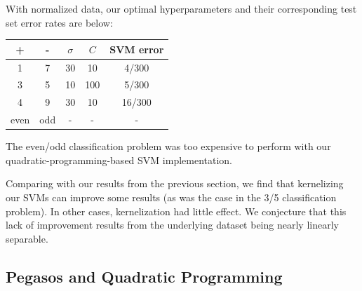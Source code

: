 \documentclass{article}
\begin{document}
\begin{multicols}{2}
With normalized data, our optimal hyperparameters
and their corresponding test set error rates are below:
\begin{center}
\begin{tabular}{|c|c|c|c|c|}
\hline
+ & - & $\sigma$ & $C$ & SVM error \\\hline
1 & 7 &30 & 10 & 4/300 \\
3 & 5 &10 & 100 & 5/300\\
4 & 9 & 30 & 10 & 16/300\\
even & odd & - & - & - \\\hline
\end{tabular}
\end{center}
The even/odd classification problem was
too expensive to perform
with our quadratic-programming-based SVM implementation.

Comparing with our results from the previous section,
we find that kernelizing our SVMs can improve some results
(as was the case in the 3/5 classification problem).
In other cases, kernelization had little effect.
We conjecture that this lack of improvement results from
the underlying dataset being nearly linearly separable.

\subsection{Pegasos and Quadratic Programming}

%
%
%




\end{multicols}
\end{document}
